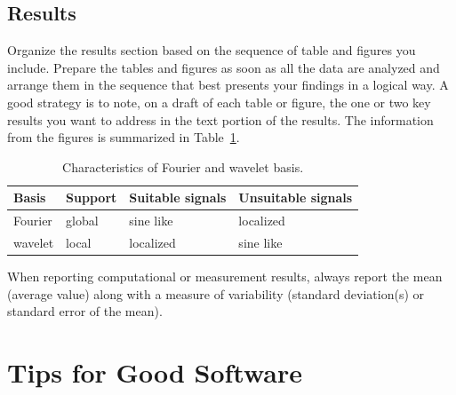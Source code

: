 \documentclass[10pt,conference,compsocconf]{IEEEtran}
\begin{document}
	\subsection{Results}
	
	Organize the results section based on the sequence of table and
	figures you include. Prepare the tables and figures as soon as all
	the data are analyzed and arrange them in the sequence that best
	presents your findings in a logical way. A good strategy is to note,
	on a draft of each table or figure, the one or two key results you
	want to address in the text portion of the results.
	The information from the figures is
	summarized in Table~\ref{tab:fourier-wavelet}.
	
	\begin{table}[htbp]
		\centering
		\begin{tabular}[c]{|l||l|l|l|}
			\hline
			Basis&Support&Suitable signals&Unsuitable signals\\
			\hline
			Fourier&global&sine like&localized\\
			wavelet&local&localized&sine like\\
			\hline
		\end{tabular}
		\caption{Characteristics of Fourier and wavelet basis.}
		\label{tab:fourier-wavelet}
	\end{table}
	
	When reporting computational or measurement results, always
	report the mean (average value) along with a measure of variability
	(standard deviation(s) or standard error of the mean).
	
	
	\section{Tips for Good Software}
	\label{sec:tips-software}
	
\end{document}
